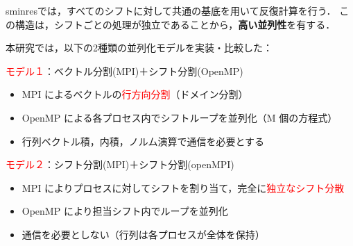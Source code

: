 

sminresでは，すべてのシフトに対して共通の基底を用いて反復計算を行う．  
この構造は，シフトごとの処理が独立であることから，\textbf{高い並列性}を有する．

本研究では，以下の2種類の並列化モデルを実装・比較した：

\textcolor{red}{モデル１}：ベクトル分割(MPI)＋シフト分割(OpenMP)
\begin{itemize} \setlength{\itemsep}{0pt}
	\item MPI によるベクトルの\textcolor{red}{行方向分割}（ドメイン分割）
	\item OpenMP による各プロセス内でシフトループを並列化（M 個の方程式）
	\item 行列ベクトル積，内積，ノルム演算で通信を必要とする
\end{itemize}
\vspace{0.5em}
\textcolor{red}{モデル２}：シフト分割(MPI)＋シフト分割(openMPI)
\begin{itemize} \setlength{\itemsep}{0pt}
	\item MPI によりプロセスに対してシフトを割り当て，完全に\textcolor{red}{独立なシフト分散}
	\item OpenMP により担当シフト内でループを並列化
	\item 通信を必要としない（行列は各プロセスが全体を保持）
\end{itemize}

